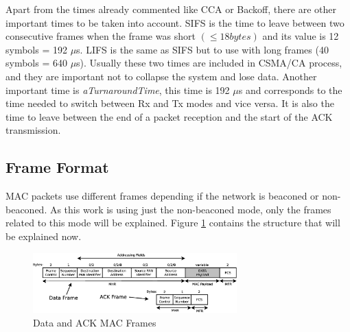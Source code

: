 Apart from the times already commented like \ac{CCA} or Backoff, there are other important times to be taken into account. \ac{SIFS} is the 
time to leave between two consecutive frames when the frame was short $(\le 18 bytes)$ and its value is 12 symbols = 192 $\mu$s. \ac{LIFS} 
is the same as \ac{SIFS} but to use with long frames (40 symbols = 640 $\mu$s). Usually these two times are included in \ac{CSMA/CA} process, 
and they are important not to collapse the system and lose data. Another important time is \textit{aTurnaroundTime}, this time is 192 $\mu$s 
and corresponds to the time needed to switch between \ac{Rx} and \ac{Tx} modes and vice versa. It is also the time to leave between the end 
of a packet reception and the start of the \ac{ACK} transmission.

\subsection{Frame Format}

\ac{MAC} packets use different frames depending if the network is beaconed or non-beaconed. As this work is using just the non-beaconed mode,
only the frames related to this mode will be explained. Figure \ref{fig:MACFrame} contains the structure that will be explained now.

\begin{figure}[!ht]
 \begin{center}
  \includegraphics[width=0.7\textwidth]{MACFrame.eps}
 \end{center}
 \caption{Data and \ac{ACK} \ac{MAC} Frames \cite{IEEE802.15.4-2006}}
 \label{fig:MACFrame}
\end{figure}

